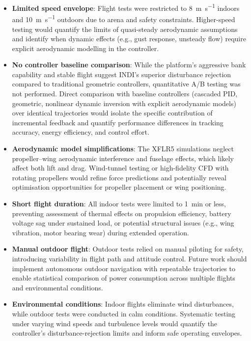 \begin{itemize}
  \item \textbf{Limited speed envelope}: Flight tests were restricted to \SI{8}{\meter\per\second} indoors and \SI{10}{\meter\per\second} outdoors due to arena and safety constraints. Higher-speed testing would quantify the limits of quasi-steady aerodynamic assumptions and identify when dynamic effects (e.g., gust response, unsteady flow) require explicit aerodynamic modelling in the controller.
  
  \item \textbf{No controller baseline comparison}: While the platform's aggressive bank capability and stable flight suggest INDI's superior disturbance rejection compared to traditional geometric controllers, quantitative A/B testing was not performed. Direct comparison with baseline controllers (cascaded PID, geometric, nonlinear dynamic inversion with explicit aerodynamic models) over identical trajectories would isolate the specific contribution of incremental feedback and quantify performance differences in tracking accuracy, energy efficiency, and control effort.
  
  \item \textbf{Aerodynamic model simplifications}: The XFLR5 simulations neglect propeller--wing aerodynamic interference and fuselage effects, which likely affect both lift and drag. Wind-tunnel testing or high-fidelity CFD with rotating propellers would refine force predictions and potentially reveal optimisation opportunities for propeller placement or wing positioning.
  
  \item \textbf{Short flight duration}: All indoor tests were limited to \SI{1}{\minute} or less, preventing assessment of thermal effects on propulsion efficiency, battery voltage sag under sustained load, or potential structural issues (e.g., wing vibration, motor bearing wear) during extended operation.
  
  \item \textbf{Manual outdoor flight}: Outdoor tests relied on manual piloting for safety, introducing variability in flight path and attitude control. Future work should implement autonomous outdoor navigation with repeatable trajectories to enable statistical comparison of power consumption across multiple flights and environmental conditions.
  
  \item \textbf{Environmental conditions}: Indoor flights eliminate wind disturbances, while outdoor tests were conducted in calm conditions. Systematic testing under varying wind speeds and turbulence levels would quantify the controller's disturbance-rejection limits and inform safe operating envelopes.
\end{itemize}


